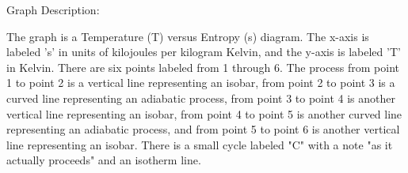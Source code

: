 Graph Description:

The graph is a Temperature (T) versus Entropy (s) diagram. The x-axis is labeled 's' in units of kilojoules per kilogram Kelvin, and the y-axis is labeled 'T' in Kelvin. There are six points labeled from 1 through 6. The process from point 1 to point 2 is a vertical line representing an isobar, from point 2 to point 3 is a curved line representing an adiabatic process, from point 3 to point 4 is another vertical line representing an isobar, from point 4 to point 5 is another curved line representing an adiabatic process, and from point 5 to point 6 is another vertical line representing an isobar. There is a small cycle labeled "C" with a note "as it actually proceeds" and an isotherm line.